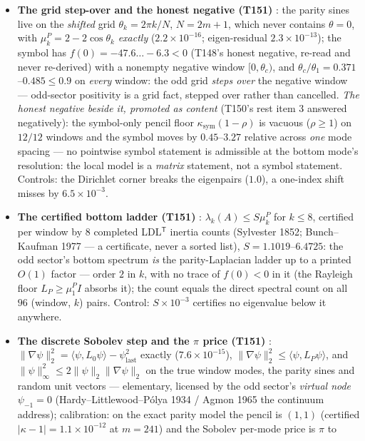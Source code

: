 \documentclass[11pt,a4paper]{article}
\begin{document}
\begin{itemize}[leftmargin=1.5em]
\item \textbf{The grid step-over and the honest negative (T151)} \mE: the parity sines live
on the \emph{shifted} grid $\theta_k=2\pi k/N$, $N=2m{+}1$, which never contains $\theta=0$,
with $\mu^P_k=2-2\cos\theta_k$ \emph{exactly} ($2.2\times10^{-16}$; eigen-residual
$2.3\times10^{-13}$); the symbol has $f(0)=-47.6\ldots-6.3<0$ (T148's honest negative,
re-read and never re-derived) with a nonempty negative window $[0,\theta_c)$, and
$\theta_c/\theta_1=0.371$--$0.485\le0.9$ on \emph{every} window: the odd grid \emph{steps
over} the negative window --- odd-sector positivity is a grid fact, stepped over rather than
cancelled. \emph{The honest negative beside it, promoted as content} (T150's rest item 3
answered negatively): the symbol-only pencil floor $\kappa_{\mathrm{sym}}(1-\rho)$ is vacuous
($\rho\ge1$) on $12/12$ windows and the symbol moves by $0.45$--$3.27$ relative across
\emph{one} mode spacing --- no pointwise symbol statement is admissible at the bottom mode's
resolution: the local model is a \emph{matrix} statement, not a symbol statement. Controls:
the Dirichlet corner breaks the eigenpairs ($1.0$), a one-index shift misses by
$6.5\times10^{-3}$.
\item \textbf{The certified bottom ladder (T151)} \mE: $\lambda_k(A)\le S\mu^P_k$ for
$k\le8$, certified per window by $8$ completed LDL$^{\mathsf T}$ inertia counts (Sylvester
1852; Bunch--Kaufman 1977 --- a certificate, never a sorted list), $S=1.1019$--$6.4725$: the
odd sector's bottom spectrum \emph{is} the parity-Laplacian ladder up to a printed $O(1)$
factor --- order $2$ in $k$, with no trace of $f(0)<0$ in it (the Rayleigh floor
$L_P\ge\mu^P_1 I$ absorbs it); the count equals the direct spectral count on all $96$
(window, $k$) pairs. Control: $S\times10^{-3}$ certifies no eigenvalue below it anywhere.
\item \textbf{The discrete Sobolev step and the $\pi$ price (T151)} \mE:
$\|\nabla\psi\|_2^2=\langle\psi,L_0\psi\rangle-\psi_{\mathrm{last}}^2$ exactly
($7.6\times10^{-15}$), $\|\nabla\psi\|_2^2\le\langle\psi,L_P\psi\rangle$, and
$\|\psi\|_\infty^2\le2\|\psi\|_2\|\nabla\psi\|_2$ on the true window modes, the parity sines
and random unit vectors --- elementary, licensed by the odd sector's \emph{virtual node}
$\psi_{-1}=0$ (Hardy--Littlewood--P\'olya 1934 / Agmon 1965 the continuum address);
calibration: on the exact parity model the pencil is $(1,1)$ (certified
$|\kappa-1|=1.1\times10^{-12}$ at $m=241$) and the Sobolev per-mode price is $\pi$ to

\end{itemize}
\end{document}
